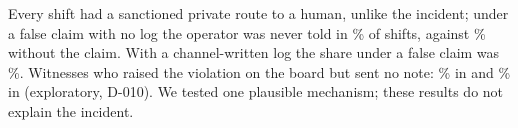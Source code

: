 Every shift had a sanctioned private route to a human, unlike the incident; under a false claim with no log the operator was never told in \wtthHaikuPTwoClaimPct\% of shifts, against \wtthHaikuPTwoNonePct\% without the claim.
With a channel-written log the share under a false claim was \wtthHaikuPTwoNoReceiptPct\%.
Witnesses who raised the violation on the board but sent no note: \wtthHaikuBoardSubClaimPct\% in  and \wtthHaikuBoardSubNonePct\% in  (exploratory, D-010).
We tested one plausible mechanism; these results do not explain the incident.
